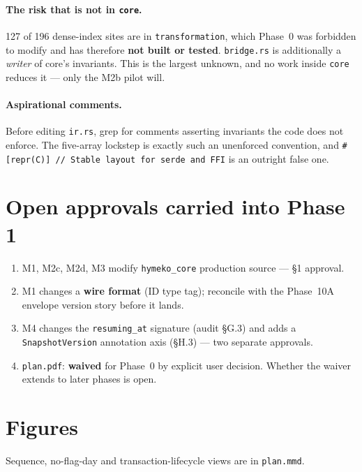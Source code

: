 \documentclass[11pt,a4paper]{article}
\newcommand{\code}[1]{\texttt{#1}}
\begin{document}
\paragraph{The risk that is not in \code{core}.} 127 of 196 dense-index sites
are in \code{transformation}, which Phase~0 was forbidden to modify and has
therefore \textbf{not built or tested}. \code{bridge.rs} is additionally a
\emph{writer} of core's invariants. This is the largest unknown, and no work
inside \code{core} reduces it --- only the M2b pilot will.

\paragraph{Aspirational comments.} Before editing \code{ir.rs}, grep for
comments asserting invariants the code does not enforce. The five-array lockstep
is exactly such an unenforced convention, and \code{\#[repr(C)] // Stable layout
for serde and FFI} is an outright false one.

\section{Open approvals carried into Phase 1}

\begin{enumerate}\itemsep2pt
  \item M1, M2c, M2d, M3 modify \code{hymeko\_core} production source --- \S1 approval.
  \item M1 changes a \textbf{wire format} (ID type tag); reconcile with the
        Phase~10A envelope version story before it lands.
  \item M4 changes the \code{resuming\_at} signature (audit \S G.3) and adds a
        \code{SnapshotVersion} annotation axis (\S H.3) --- two separate approvals.
  \item \code{plan.pdf}: \textbf{waived} for Phase~0 by explicit user decision.
        Whether the waiver extends to later phases is open.
\end{enumerate}

\section{Figures}



\noindent
Sequence, no-flag-day and transaction-lifecycle views are in \code{plan.mmd}.
\end{document}
